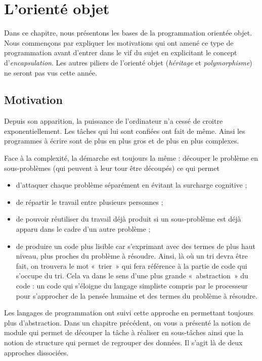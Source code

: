 \chapter{L'orienté objet}

		Dans ce chapitre, nous présentons les bases de la programmation orientée
		objet. Nous commençons par expliquer les motivations qui ont amené ce
		type de programmation avant d'entrer dans le vif du
		sujet en explicitant le concept
		d'\textit{encapsulation}. Les autres piliers de
		l'orienté objet (\textit{héritage} et
		\textit{polymorphisme}) ne seront pas vus cette année.

\section{Motivation}
	Depuis son apparition, la puissance de l'ordinateur
	n'a cessé de croitre exponentiellement. Les tâches qui
	lui sont confiées ont fait de même. Ainsi les programmes à écrire sont
	de plus en plus gros et de plus en plus complexes.

	
	Face à la complexité, la démarche est toujours la même : découper le
	problème en sous-problèmes (qui peuvent à leur tour être découpés) ce
	qui permet

	\liststyleListv
	\begin{itemize}
	\item {
	d'attaquer chaque problème séparément en évitant la
	surcharge cognitive ;}
	\item {
	de répartir le travail entre plusieurs personnes ;}
	\item {
	de pouvoir réutiliser du travail déjà produit si un sous-problème est
	déjà apparu dans le cadre d'un autre problème ;}
	\item {
	de produire un code plus lisible car s'exprimant avec
	des termes de plus haut niveau, plus proches du problème à résoudre.
	Ainsi, là où un tri devra être fait, on trouvera le mot «~trier~» qui
	fera référence à la partie de code qui s’occupe du tri. Cela va dans le
	sens d’une plus grande «~abstraction~» du code : un code qui s’éloigne
	du langage simpliste compris par le processeur pour s’approcher de la
	pensée humaine et des termes du problème à résoudre.}
	\end{itemize}
	{
	Les langages de programmation ont suivi cette approche en permettant
	toujours plus d’abstraction. Dans un chapitre précédent, on vous a
	présenté la notion de module qui permet de découper la tâche à réaliser
	en sous-tâches ainsi que la notion de structure qui permet de regrouper
	des données. Il s'agit là de deux approches
	dissociées. }

